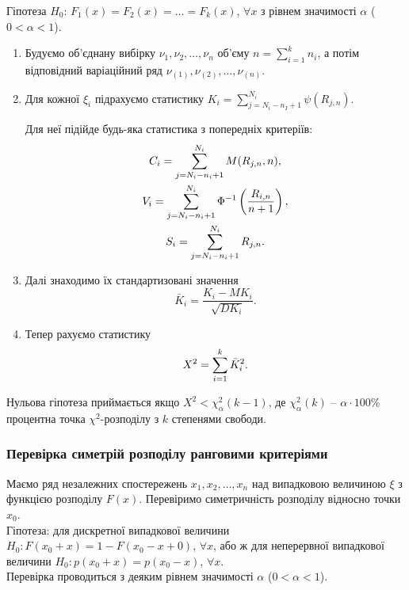 Гіпотеза $H_0$: $F_1(x) = F_2(x) = \ldots = F_k(x)$, $\forall x$ з рівнем значимості $\alpha$ ($0 < \alpha < 1$). 

\begin{enumerate}
    \item Будуємо об'єднану вибірку $\nu_1, \nu_2, \ldots, \nu_n$ об'єму $n = \sum_{i=1}^k n_i$, а потім відповідний варіаційний ряд $\nu_{(1)}, \nu_{(2)}, \ldots, \nu_{(n)}$.
    
    \item Для кожної $\xi_i$ підрахуємо статистику $K_i = \sum_{j = N_i - n_I + 1}^{N_i} \psi(R_{j, n})$. 
    
    Для неї підійде будь-яка статистика з попередніх критеріїв:
    \begin{multline*} 
        C_i = \displaystyle\sum\limits_{j = N_i - n_i + 1}^{N_i} M(R_{j, n}, n), \\
        V_i = \displaystyle\sum\limits_{j = N_i - n_i + 1}^{N_i} \Phi^{-1} \left( \dfrac{R_{i,n}}{n+1} \right), \\
        S_i = \displaystyle\sum\limits_{j = N_i - n_i + 1}^{N_i} R_{j, n}.
    \end{multline*}
    
    \item Далі знаходимо їх стандартизовані значення \[\bar{K}_i = \dfrac{K_i - MK_i}{\sqrt{DK_i}}.\]
    
    \item Тепер рахуємо статистику \[X^2 = \displaystyle\sum\limits_{i=1}^k \bar{K}_i^2.\] 
\end{enumerate}

Нульова гіпотеза приймається якщо $X^2 < \chi_\alpha^2(k-1)$, де $\chi_\alpha^2(k)$ -- $\alpha \cdot 100\%$ процентна точка $\chi^2$-розподілу з $k$ степенями свободи.

\subsubsection{Перевірка симетрій розподілу ранговими критеріями}

Маємо ряд незалежних спостережень $x_1, x_2, \ldots, x_n$ над випадковою величиною $\xi$ з функцією розподілу $F(x)$. Перевіримо симетричність розподілу відносно точки $x_0$. \\

Гіпотеза: для дискретної випадкової величини $H_0: F(x_0 + x) = 1 - F(x_0 - x + 0)$, $\forall x$, або ж для неперервної випадкової величини $H_0: p(x_0 + x) = p(x_0 - x)$, $\forall x$. \\

Перевірка проводиться з деяким рівнем значимості $\alpha$ ($0 < \alpha < 1$). \\

